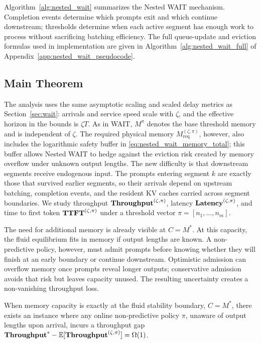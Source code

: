 Algorithm~\ref{alg:nested_wait} summarizes the Nested WAIT mechanism. Completion events determine which prompts exit and which continue downstream; thresholds determine when each active segment has enough work to process without sacrificing batching efficiency. The full queue-update and eviction formulas used in implementation are given in Algorithm~\ref{alg:nested_wait_full} of Appendix~\ref{app:nested_wait_pseudocode}.

\subsection{Main Theorem}
\label{subsec:nested_main_theorem}

The analysis uses the same asymptotic scaling and scaled delay metrics as Section~\ref{sec:wait}: arrivals and service speed scale with \(\zeta\), and the effective horizon in the bounds is \(\zeta T\). As in WAIT, \(M^\pi\) denotes the base threshold memory and is independent of \(\zeta\). The required physical memory \(M_{\mathrm{req}}^{(\zeta,\pi)}\), however, also includes the logarithmic safety buffer in \eqref{eq:nested_wait_memory_total}; this buffer allows Nested WAIT to hedge against the eviction risk created by memory overflow under unknown output lengths. The new difficulty is that downstream segments receive endogenous input. The prompts entering segment \(k\) are exactly those that survived earlier segments, so their arrivals depend on upstream batching, completion events, and the resident KV caches carried across segment boundaries. We study throughput \(\textbf{Throughput}^{(\zeta,\pi)}\), latency \(\textbf{Latency}^{(\zeta,\pi)}\), and time to first token \(\textbf{TTFT}^{(\zeta,\pi)}\) under a threshold vector \(\pi=[n_1,\dots,n_m]\).

The need for additional memory is already visible at \(C=M^*\). At this capacity, the fluid equilibrium fits in memory if output lengths are known. A non-predictive policy, however, must admit prompts before knowing whether they will finish at an early boundary or continue downstream. Optimistic admission can overflow memory once prompts reveal longer outputs; conservative admission avoids that risk but leaves capacity unused. The resulting uncertainty creates a non-vanishing throughput loss.

\begin{proposition}
\label{prop:unknown_lower_bound}
When memory capacity is exactly at the fluid stability boundary, \(C=M^*\), there exists an instance where any online non-predictive policy \( \pi \), unaware of output lengths upon arrival, incurs a throughput gap \( \textbf{Throughput}^* - \mathbb{E}[\textbf{Throughput}^{(\zeta, \pi)}] = \Omega(1) \).
\end{proposition}

